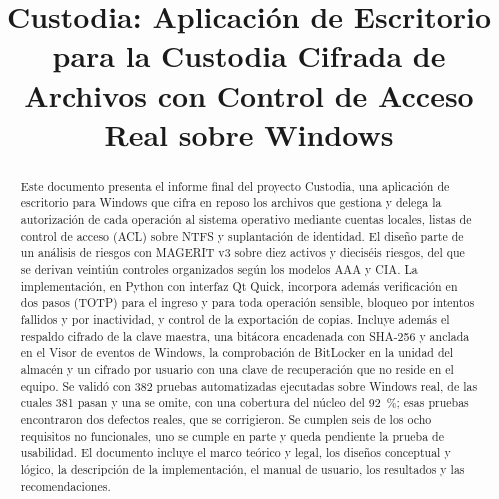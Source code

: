 \documentclass[conference]{IEEEtran}
\begin{document}
\title{Custodia: Aplicación de Escritorio para la Custodia Cifrada de Archivos con Control de Acceso Real sobre Windows}

\author{
\and
{}
}

\maketitle

\begin{abstract}
Este documento presenta el informe final del proyecto Custodia, una aplicación de escritorio para Windows que cifra en reposo los archivos que gestiona y delega la autorización de cada operación al sistema operativo mediante cuentas locales, listas de control de acceso (ACL) sobre NTFS y suplantación de identidad. El diseño parte de un análisis de riesgos con MAGERIT v3 sobre diez activos y dieciséis riesgos, del que se derivan veintiún controles organizados según los modelos AAA y CIA. La implementación, en Python con interfaz Qt Quick, incorpora además verificación en dos pasos (TOTP) para el ingreso y para toda operación sensible, bloqueo por intentos fallidos y por inactividad, y control de la exportación de copias. Incluye además el respaldo cifrado de la clave maestra, una bitácora encadenada con SHA-256 y anclada en el Visor de eventos de Windows, la comprobación de BitLocker en la unidad del almacén y un cifrado por usuario con una clave de recuperación que no reside en el equipo. Se validó con 382 pruebas automatizadas ejecutadas sobre Windows real, de las cuales 381 pasan y una se omite, con una cobertura del núcleo del 92~\%; esas pruebas encontraron dos defectos reales, que se corrigieron. Se cumplen seis de los ocho requisitos no funcionales, uno se cumple en parte y queda pendiente la prueba de usabilidad. El documento incluye el marco teórico y legal, los diseños conceptual y lógico, la descripción de la implementación, el manual de usuario, los resultados y las recomendaciones.
\end{abstract}
\end{document}
